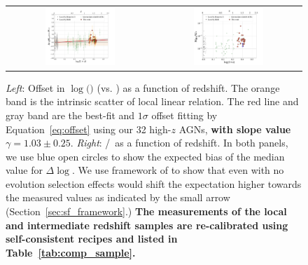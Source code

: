 \documentclass[apj]{emulateapj}
\begin{document}
\begin{figure}
\centering
\begin{tabular}{c c}
{\includegraphics[width=0.5\textwidth]{fig/MBH-Mstar-vz_style1.pdf}}&
{\includegraphics[width=0.5\textwidth]{fig/MBH-Mstar-vz_style0.pdf}}\\
\end{tabular}
\caption{\label{fig:MM-vz} 
 {\it Left}: Offset in  $\log($\mbh$)$ (vs. \smass) as a function of redshift. The orange band is the intrinsic scatter of local linear relation. The red line and gray band are the best-fit and $1\sigma$ offset fitting by Equation~\ref{eq:offset} using our 32 high-$z$ AGNs, {\bf with slope value $\gamma  = 1.03 \pm 0.25$}. {\it Right}: \mbh/\smass\ as a function of redshift. In both panels, we use blue open circles to show the expected bias of the median value for $\Delta \log$\mbh. We use framework of \citet{Schulze2011,Schulze2014} to show that even with no evolution selection effects would shift the expectation higher towards the measured values as indicated by the small arrow (Section~\ref{sec:sf_framework}.) {\bf The measurements of the local and intermediate redshift samples are re-calibrated using self-consistent recipes and listed in Table~\ref{tab:comp_sample}.}}
\end{figure} 
\end{document}
